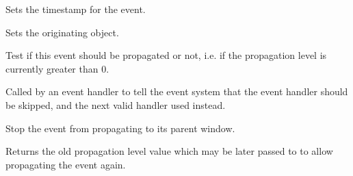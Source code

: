 Sets the timestamp for the event.

Sets the originating object.

\label{wxeventshouldpropagate}


Test if this event should be propagated or not, i.e. if the propagation level
is currently greater than $0$.

\label{wxeventskip}


Called by an event handler to tell the event system that the
event handler should be skipped, and the next valid handler used
instead.

\label{wxeventstoppropagation}


Stop the event from propagating to its parent window.

Returns the old propagation level value which may be later passed to 
 to allow propagating the
event again.

